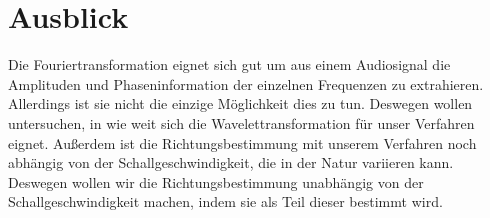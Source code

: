 \section{Ausblick} %
Die Fouriertransformation eignet sich gut um aus einem Audiosignal die Amplituden und Phaseninformation der einzelnen Frequenzen zu extrahieren. Allerdings ist sie nicht die einzige Möglichkeit dies zu tun. Deswegen wollen untersuchen, in wie weit sich die Wavelettransformation für unser Verfahren eignet. Außerdem ist die Richtungsbestimmung mit unserem Verfahren noch abhängig von der Schallgeschwindigkeit, die in der Natur variieren kann. Deswegen wollen wir die Richtungsbestimmung unabhängig von der Schallgeschwindigkeit machen, indem sie als Teil dieser bestimmt wird.
